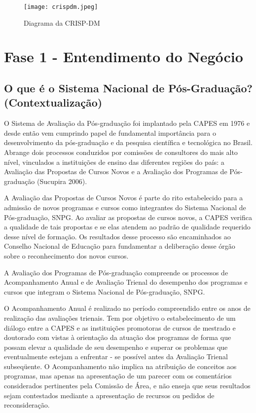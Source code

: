 \documentclass[]{article}
\begin{document}
\begin{figure}
\centering
\texttt{[image: crispdm.jpeg]}
\caption{Diagrama da CRISP-DM}
\end{figure}

\hypertarget{fase-1---entendimento-do-neguxf3cio}{%
\section{Fase 1 - Entendimento do
Negócio}\label{fase-1---entendimento-do-neguxf3cio}}

\hypertarget{o-que-uxe9-o-sistema-nacional-de-puxf3s-graduauxe7uxe3o-contextualizauxe7uxe3o}{%
\subsection{O que é o Sistema Nacional de Pós-Graduação?
(Contextualização)}\label{o-que-uxe9-o-sistema-nacional-de-puxf3s-graduauxe7uxe3o-contextualizauxe7uxe3o}}

O Sistema de Avaliação da Pós-graduação foi implantado pela CAPES em
1976 e desde então vem cumprindo papel de fundamental importância para o
desenvolvimento da pós-graduação e da pesquisa científica e tecnológica
no Brasil. Abrange dois processos conduzidos por comissões de
consultores do mais alto nível, vinculados a instituições de ensino das
diferentes regiões do país: a Avaliação das Propostas de Cursos Novos e
a Avaliação dos Programas de Pós-graduação (Sucupira 2006).

A Avaliação das Propostas de Cursos Novos é parte do rito estabelecido
para a admissão de novos programas e cursos como integrantes do Sistema
Nacional de Pós-graduação, SNPG. Ao avaliar as propostas de cursos
novos, a CAPES verifica a qualidade de tais propostas e se elas atendem
ao padrão de qualidade requerido desse nível de formação. Os resultados
desse processo são encaminhados ao Conselho Nacional de Educação para
fundamentar a deliberação desse órgão sobre o reconhecimento dos novos
cursos.

A Avaliação dos Programas de Pós-graduação compreende os processos de
Acompanhamento Anual e de Avaliação Trienal do desempenho dos programas
e cursos que integram o Sistema Nacional de Pós-graduação, SNPG.

O Acompanhamento Anual é realizado no período compreendido entre os anos
de realização das avaliações trienais. Tem por objetivo o
estabelecimento de um diálogo entre a CAPES e as instituições promotoras
de cursos de mestrado e doutorado com vistas à orientação da atuação dos
programas de forma que possam elevar a qualidade de seu desempenho e
superar os problemas que eventualmente estejam a enfrentar - se possível
antes da Avaliação Trienal subseqüente. O Acompanhamento não implica na
atribuição de conceitos aos programas, mas apenas na apresentação de um
parecer com os comentários considerados pertinentes pela Comissão de
Área, e não enseja que seus resultados sejam contestados mediante a
apresentação de recursos ou pedidos de reconsideração.
\end{document}
